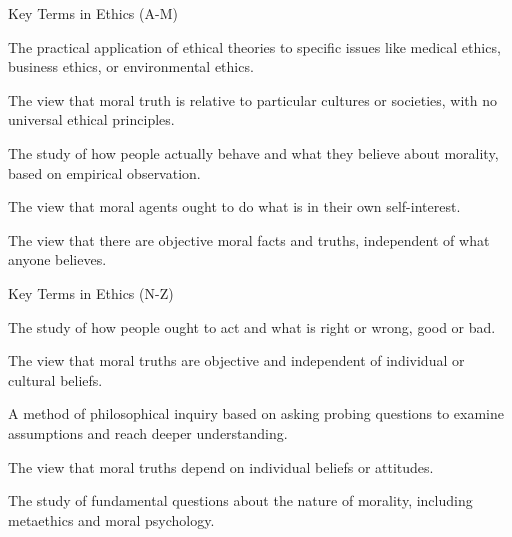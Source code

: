 \documentclass[aspectratio=169]{beamer}
\begin{document}
\begin{frame}{Key Terms in Ethics (A-M)}
\begin{description}[leftmargin=!,labelwidth=\widthof{\bfseries Moral Realism}]
\item[\textbf{Applied Ethics}] The practical application of ethical theories to specific issues like medical ethics, business ethics, or environmental ethics.

\item[\textbf{Cultural Relativism}] The view that moral truth is relative to particular cultures or societies, with no universal ethical principles.

\item[\textbf{Descriptive Ethics}] The study of how people actually behave and what they believe about morality, based on empirical observation.

\item[\textbf{Ethical Egoism}] The view that moral agents ought to do what is in their own self-interest.

\item[\textbf{Moral Realism}] The view that there are objective moral facts and truths, independent of what anyone believes.
\end{description}
\end{frame}

\begin{frame}{Key Terms in Ethics (N-Z)}
\begin{description}[leftmargin=!,labelwidth=\widthof{\bfseries Theoretical}]
\item[\textbf{Normative Ethics}] The study of how people ought to act and what is right or wrong, good or bad.

\item[\textbf{Objectivism}] The view that moral truths are objective and independent of individual or cultural beliefs.

\item[\textbf{Socratic Method}] A method of philosophical inquiry based on asking probing questions to examine assumptions and reach deeper understanding.

\item[\textbf{Subjectivism}] The view that moral truths depend on individual beliefs or attitudes.

\item[\textbf{Theoretical Ethics}] The study of fundamental questions about the nature of morality, including metaethics and moral psychology.
\end{description}
\end{frame}
\end{document}
